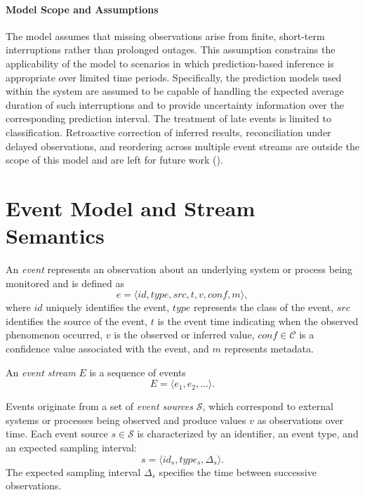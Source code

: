 \paragraph{Model Scope and Assumptions}
The model assumes that missing observations arise from finite, short-term interruptions rather than prolonged outages. This assumption constrains the applicability of the model to scenarios in which prediction-based inference is appropriate over limited time periods. Specifically, the prediction models used within the system are assumed to be capable of handling the expected average duration of such interruptions and to provide uncertainty information over the corresponding prediction interval.
The treatment of late events is limited to classification. Retroactive correction of inferred results, reconciliation under delayed observations, and reordering across multiple event streams are outside the scope of this model and are left for future work ().


\section{Event Model and Stream Semantics}
\label{sec:events-streams}

An \emph{event} represents an observation about an underlying system or process being monitored and is defined as
\begin{equation}
e = \langle id, type, src, t, v, conf, m \rangle ,
\end{equation}
\noindent
where $id$ uniquely identifies the event, $type$ represents the class of the event, $src$ identifies the source of the event, $t$ is the event time indicating when the observed phenomenon occurred, $v$ is the observed or inferred value, $conf \in \mathcal{C}$ is a confidence value associated with the event, and $m$ represents metadata.

An \emph{event stream} $E$ is a sequence of events
\begin{equation}
E = \langle e_1, e_2, \dots \rangle .
\end{equation}

Events originate from a set of \emph{event sources} $\mathcal{S}$, which correspond to external systems or processes being observed and produce values $v$ as observations over time. Each event source $s \in \mathcal{S}$ is characterized by an identifier, an event type, and an expected sampling interval:
\begin{equation}
s = \langle id_s, type_s, \Delta_s \rangle .
\end{equation}
\noindent
The expected sampling interval $\Delta_s$ specifies the time between successive observations.

